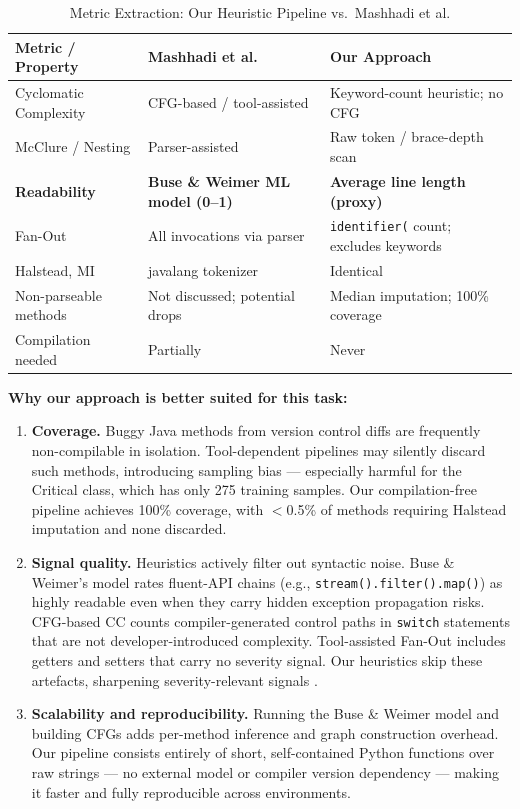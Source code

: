 \documentclass[12pt, a4paper]{report}
\begin{document}
\begin{table}[h!]
\centering
\caption{Metric Extraction: Our Heuristic Pipeline vs.\ Mashhadi et al.}
\label{tab:mashhadi_vs_ours}
\small
\begin{tabular}{L{2.6cm} L{4.8cm} L{4.8cm}}
\toprule
\textbf{Metric / Property} & \textbf{Mashhadi et al.\ \cite{mashhadi}} & \textbf{Our Approach} \\
\midrule
Cyclomatic Complexity & CFG-based / tool-assisted & Keyword-count heuristic; no CFG \\
McClure / Nesting & Parser-assisted & Raw token / brace-depth scan \\
\textbf{Readability} & \textbf{Buse \& Weimer ML model (0--1)} & \textbf{Average line length (proxy)} \\
Fan-Out & All invocations via parser & \texttt{identifier(} count; excludes keywords \\
Halstead, MI & javalang tokenizer & Identical \\
\midrule
Non-parseable methods & Not discussed; potential drops & Median imputation; 100\% coverage \\
Compilation needed & Partially & Never \\
\bottomrule
\end{tabular}
\end{table}

\noindent\textbf{Why our approach is better suited for this task:}

\begin{enumerate}[leftmargin=1.5cm]
  \item \textbf{Coverage.} Buggy Java methods from version control diffs are frequently non-compilable in isolation. Tool-dependent pipelines may silently discard such methods, introducing sampling bias --- especially harmful for the Critical class, which has only 275 training samples. Our compilation-free pipeline achieves 100\% coverage, with $<$0.5\% of methods requiring Halstead imputation and none discarded.

  \item \textbf{Signal quality.} Heuristics actively filter out syntactic noise. Buse \& Weimer's model rates fluent-API chains (e.g., \texttt{stream().filter().map()}) as highly readable even when they carry hidden exception propagation risks. CFG-based CC counts compiler-generated control paths in \texttt{switch} statements that are not developer-introduced complexity. Tool-assisted Fan-Out includes getters and setters that carry no severity signal. Our heuristics skip these artefacts, sharpening severity-relevant signals \cite{fse2026}.

  \item \textbf{Scalability and reproducibility.} Running the Buse \& Weimer model and building CFGs adds per-method inference and graph construction overhead. Our pipeline consists entirely of short, self-contained Python functions over raw strings --- no external model or compiler version dependency --- making it faster and fully reproducible across environments.
\end{enumerate}
\end{document}
